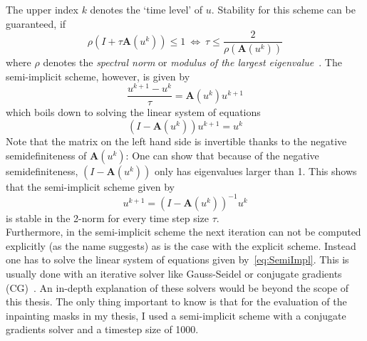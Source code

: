 The upper index $k$ denotes the `time level' of $u$.
Stability for this scheme can be guaranteed, if 
\begin{equation}
    \rho(I + \tau\mathbf{A}(u^k)) \leq 1\ \Leftrightarrow\ \tau \leq \frac{2}{\rho(\mathbf{A}(u^k))}
\end{equation}
where $\rho$ denotes the \textit{spectral norm} or \textit{modulus of the largest
eigenvalue}~\cite{www13}.\newpage\noindent
The semi-implicit scheme, however, is given by
\begin{equation}
    \frac{u^{k+1} - u^{k}}{\tau} = \mathbf{A}(u^k)u^{k+1}
\end{equation}
which boils down to solving the linear system of equations
\begin{equation}
    (I-\mathbf{A}(u^k))u^{k+1} = u^k\label{eq:SemiImpl}
\end{equation}
Note that the matrix on the left hand side is invertible thanks to the negative semidefiniteness of
$\mathbf{A}(u^k)$: One can show that because of the negative semidefiniteness, $(I-\mathbf{A}(u^k))$ only has eigenvalues
larger than 1.
This shows that the semi-implicit scheme given by 
\begin{equation}
    u^{k+1} = {(I- \mathbf{A}(u^k))}^{-1}u^k
\end{equation}
is stable in the 2-norm for every time step size $\tau$.\\
Furthermore, in the semi-implicit scheme the next iteration can not be computed explicitly (as the name
suggests) as is the case with the explicit scheme. Instead one has to solve
the linear system of equations given by~\eqref{eq:SemiImpl}. This is usually done with an iterative
solver like Gauss-Seidel or conjugate gradients (CG)~\cite{conjugateGradients}. 
An in-depth explanation of these solvers would be beyond the scope of this thesis.
The only thing important to know is that for the evaluation of the inpainting masks in my thesis,
I used a semi-implicit scheme with a conjugate gradients solver and a timestep size of 1000.

